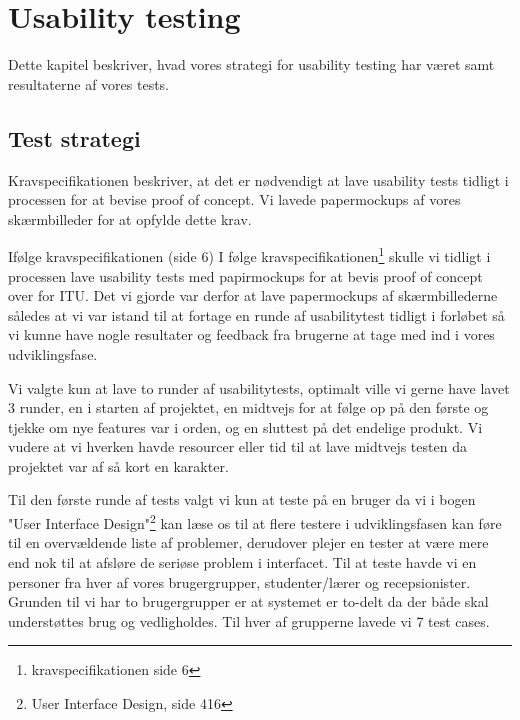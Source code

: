 \chapter{Usability testing}
Dette kapitel beskriver, hvad vores strategi for usability testing har været samt resultaterne af vores tests.

\section{Test strategi}
Kravspecifikationen beskriver, at det er nødvendigt at lave usability tests tidligt i processen for at bevise proof of concept. Vi lavede papermockups af vores skærmbilleder for at opfylde dette krav. 

Ifølge kravspecifikationen (side 6)
I følge kravspecifikationen\footnote{kravspecifikationen side 6} skulle vi tidligt i processen lave usability tests med papirmockups for at bevis proof of concept over for ITU. Det vi gjorde var derfor at lave papermockups af skærmbillederne således at vi var istand til at 
fortage en runde af usabilitytest tidligt i forløbet så vi kunne have nogle resultater og feedback fra brugerne at tage med ind i vores udviklingsfase.

Vi valgte kun at lave to runder af usabilitytests, optimalt ville vi gerne have lavet 3 runder, en i starten af projektet, en midtvejs for at følge op på den første og tjekke om nye features var i orden, og en sluttest på det endelige produkt. Vi vudere at vi hverken havde resourcer eller tid til at lave midtvejs testen da projektet var af så kort en karakter.

Til den første runde af tests valgt vi kun at teste på en bruger da vi i bogen "User Interface Design"\footnote{User Interface Design, side 416} kan læse os til at flere testere i udviklingsfasen kan føre til en overvældende liste af problemer, derudover plejer en tester at være mere end nok til at afsløre de seriøse problem i interfacet.
Til at teste havde vi en personer fra hver af vores brugergrupper, studenter/lærer og recepsionister. Grunden til vi har to brugergrupper er at systemet er to-delt da der både skal understøttes brug og vedligholdes. Til hver af grupperne lavede vi 7 test cases.

